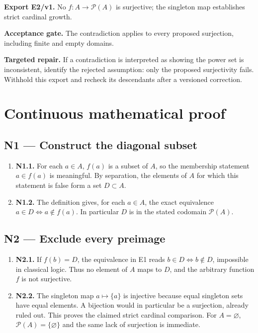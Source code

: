 \documentclass[preprint,12pt,aps,pra,showkeys,amsmath,amssymb,superscriptaddress,floatfix]{revtex4-2}
\theoremstyle{definition}
\theoremstyle{remark}
\newcommand{\field}[2]{\par\smallskip\noindent\textbf{#1.} #2\par}
\begin{document}
\field{Export E2/v1}{No \(f:A\to\mathcal P(A)\) is surjective; the singleton map establishes
strict cardinal growth.}

\field{Acceptance gate}{The contradiction applies to every proposed surjection, including finite
and empty domains.}

\field{Targeted repair}{If a contradiction is interpreted as showing the power set is
inconsistent, identify the rejected assumption: only the proposed
surjectivity fails. Withhold this export and recheck its descendants
after a versioned correction.}

\endgroup\clearpage\section{Continuous mathematical proof}\label{sec:proof}

\subsection{N1 --- Construct the diagonal
subset}\label{n1-construct-the-diagonal-subset}

\begin{enumerate}
\def\labelenumi{\arabic{enumi}.}
\item
  \textbf{N1.1.} For each \(a\in A\), \(f(a)\) is a subset of \(A\), so
  the membership statement \(a\in f(a)\) is meaningful. By separation,
  the elements of \(A\) for which this statement is false form a set
  \(D\subset A\).
\item
  \textbf{N1.2.} The definition gives, for each \(a\in A\), the exact
  equivalence \(a\in D\iff a\notin f(a)\). In particular \(D\) is in the
  stated codomain \(\mathcal P(A)\).
\end{enumerate}

\subsection{N2 --- Exclude every
preimage}\label{n2-exclude-every-preimage}

\begin{enumerate}
\def\labelenumi{\arabic{enumi}.}
\item
  \textbf{N2.1.} If \(f(b)=D\), the equivalence in E1 reads
  \(b\in D\iff b\notin D\), impossible in classical logic. Thus no
  element of \(A\) maps to \(D\), and the arbitrary function \(f\) is
  not surjective.
\item
  \textbf{N2.2.} The singleton map \(a\mapsto\{a\}\) is injective
  because equal singleton sets have equal elements. A bijection would in
  particular be a surjection, already ruled out. This proves the claimed
  strict cardinal comparison. For \(A=\varnothing\),
  \(\mathcal P(A)=\{\varnothing\}\) and the same lack of surjection is
  immediate.
\end{enumerate}
\end{document}
